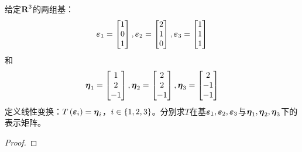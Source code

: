 \setcounter{problem}{32}
\begin{problem}
给定\(\boldsymbol{\mathrm{R}}^3\)的两组基：
\begin{equation*}
    \boldsymbol{\varepsilon}_1=\begin{bmatrix}1\\0\\1\end{bmatrix},
    \boldsymbol{\varepsilon}_2=\begin{bmatrix}2\\1\\0\end{bmatrix},
    \boldsymbol{\varepsilon}_3=\begin{bmatrix}1\\1\\1\end{bmatrix}
\end{equation*}
和
\begin{equation*}
    \boldsymbol{\eta}_1=\begin{bmatrix}1\\2\\-1\end{bmatrix},
    \boldsymbol{\eta}_2=\begin{bmatrix}2\\2\\-1\end{bmatrix},
    \boldsymbol{\eta}_3=\begin{bmatrix}2\\-1\\-1\end{bmatrix}
\end{equation*}
定义线性变换：\(T\left( \boldsymbol{\varepsilon}_i \right)=\boldsymbol{\eta}_i\)，\(i\in\left\{1,2,3 \right\}\)。分别求\(T\)在基\(\boldsymbol{\varepsilon}_1,\boldsymbol{\varepsilon}_2,\boldsymbol{\varepsilon}_3\)与\(\boldsymbol{\eta}_1,\boldsymbol{\eta}_2,\boldsymbol{\eta}_3\)下的表示矩阵。
\end{problem}
\begin{proof}

\end{proof}